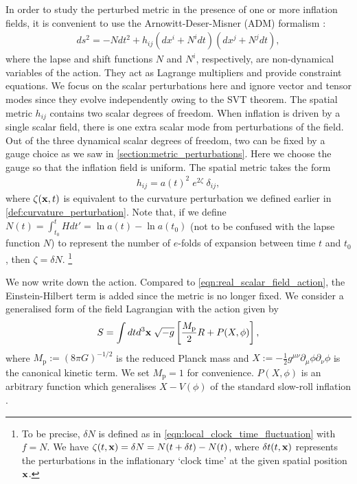 In order to study the perturbed metric in the presence of one or more inflation fields, it is convenient to use the Arnowitt-Deser-Misner (ADM) formalism \cite{Arnowitt2008ADMrepublication}:
\begin{align}
	ds^2 = -N dt^2 + h_{ij}(dx^i + N^i dt) (dx^j + N^j dt),
\end{align}
where the lapse and shift functions $N$ and $N^i$, respectively, are non-dynamical variables of the action. They act as Lagrange multipliers and provide constraint equations. We focus on the scalar perturbations here and ignore vector and tensor modes since they evolve independently owing to the SVT theorem. The spatial metric $h_{ij}$ contains two scalar degrees of freedom. When inflation is driven by a single scalar field, there is one extra scalar mode from perturbations of the field. Out of the three dynamical scalar degrees of freedom, two can be fixed by a gauge choice as we saw in \ref{section:metric_perturbations}. Here we choose the gauge so that the inflation field is uniform. The spatial metric takes the form
\begin{align}
	h_{ij} = a(t)^2 \;e^{2\zeta} \; \delta_{ij},  \label{eqn:spatial_metric_curvature_perturbation}
\end{align}
where $\zeta(\mathbf{x},t)$ is equivalent to the curvature perturbation we defined earlier in \eqref{def:curvature_perturbation}. Note that, if we define $N(t) = \int^{t}_{t_0} H dt' = \ln a(t) - \ln a(t_0)$ (not to be confused with the lapse function $N$) to represent the number of $e$-folds of expansion between time $t$ and $t_0$, then $\zeta = \delta N$. \footnote{To be precise, $\delta N$ is defined as in \eqref{eqn:local_clock_time_fluctuation} with $f=N$. We have $\zeta(t,\mathbf{x})= \delta N = N(t+\delta t) - N(t)$, where $\delta t(t,\mathbf{x})$ represents the perturbations in the inflationary `clock time' at the given spatial position $\mathbf{x}$.}
	
We now write down the action. Compared to \eqref{eqn:real_scalar_field_action}, the Einstein-Hilbert term is added since the metric is no longer fixed. We consider a generalised form of the field Lagrangian with the action given by
\begin{align}
	S = \int dt d^3 \mathbf{x} \; \sqrt{-g} \left[ \frac{M_\textrm{p}}{2} R + P(X,\phi) \right],  \label{eqn:general_single_field_action}
\end{align}
where $M_\textrm{p} := (8\pi G)^{-1/2}$ is the reduced Planck mass and $X:=-\frac{1}{2} g^{\mu\nu} \partial_\mu \phi \partial_\nu \phi$ is the canonical kinetic term. We set $M_\textrm{p}=1$ for convenience. $P(X,\phi)$ is an arbitrary function which generalises $X-V(\phi)$ of the standard slow-roll inflation \cite{Chen2007b}.

